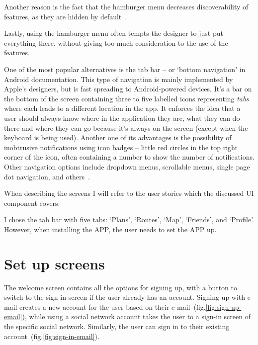 Another reason is the fact that the hamburger menu decreases discoverability of features, as they are hidden by default~\cite{hamburger-discoverabillity}.

Lastly, using the hamburger menu often tempts the designer to just put everything there, without giving too much consideration to the use of the features.

One of the most popular alternatives is the tab bar -- or `bottom navigation' in Android documentation.
This type of navigation is mainly implemented by Apple's designers, but is fast spreading to Android-powered devices.
It's a bar on the bottom of the screen containing three to five labelled icons representing \textit{tabs} where each leads to a different location in the app.
It enforces the idea that a user should always know where in the application they are, what they can do there and where they can go because it's always on the screen (except when the keyboard is being used).
Another one of its advantages is the possibility of inobtrusive notifications using icon badges -- little red circles in the top right corner of the icon, often containing a number to show the number of notifications.
Other navigation options include dropdown menus, scrollable menus, single page dot navigation, and others~\cite{hamburger-alternatives}.

When describing the screens I will refer to the user stories which the discussed UI component covers.

I chose the tab bar with five tabs: `Plans', `Routes', `Map', `Friends', and `Profile'.
However, when installing the APP, the user needs to set the APP up.

\section{Set up screens}
The welcome screen contains all the options for signing up, with a button to switch to the sign-in screen if the user already has an account.
Signing up with e-mail creates a new account for the user based on their e-mail~(fig.\ref{fig:sign-up-email}), while using a social network account takes the user to a sign-in screen of the specific social network.
Similarly, the user can sign in to their existing account~(fig.\ref{fig:sign-in-email}).


